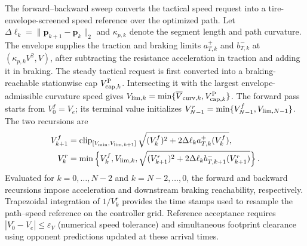 \documentclass[journal,twoside,web]{ieeecolor}
\begin{document}
The forward--backward sweep converts the tactical speed request into a
tire-envelope-screened speed reference over the optimized path. Let
$\Delta\ell_k=\|\bm p_{k+1}-\bm p_k\|_2$ and $\kappa_{p,k}$ denote the segment
length and path curvature. The envelope supplies the traction and
braking limits \(a_{T,k}^{+}\) and \(b_{T,k}^{-}\) at
\((\kappa_{p,k}V^2,V)\), after subtracting the resistance acceleration in
traction and adding it in braking.
The steady tactical request is first converted into a braking-reachable
stationwise cap $V_{{\rm cap},k}^{\rm P}$. Intersecting it with the largest
envelope-admissible curvature speed gives
$V_{{\rm lim},k}=\min\{\overline V_{{\rm curv},k},
V_{{\rm cap},k}^{\rm P}\}$. The forward pass starts from $V_0^f=V_e$;
its terminal value initializes
$V_{N-1}^r=\min\{V_{N-1}^{f},V_{{\rm lim},N-1}\}$. The two recursions are
\begin{equation}
\begin{aligned}
V_{k+1}^{f}&=\operatorname{clip}_{[V_{\min},V_{{\rm lim},k+1}]}
\sqrt{(V_k^f)^2+2\Delta\ell_k a_{T,k}^{+}(V_k^f)},\\
V_k^r&=\min\left\{V_k^f,V_{{\rm lim},k},
\sqrt{(V_{k+1}^r)^2+
2\Delta\ell_k b_{T,k+1}^{-}(V_{k+1}^r)}\right\}.
\end{aligned}
\label{eq:execution_speed_sweep}
\end{equation}
Evaluated for $k=0,\ldots,N-2$ and $k=N-2,\ldots,0$, the forward and backward
recursions impose acceleration and downstream braking reachability,
respectively. Trapezoidal integration of $1/V_k^r$ provides the time stamps
used to resample the path--speed reference on the controller grid.
Reference acceptance requires $|V_0^r-V_e|\le\varepsilon_V$
(numerical speed tolerance) and simultaneous footprint clearance using
opponent predictions updated at these arrival times.
\end{document}
